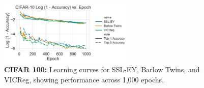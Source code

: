 \begin{figure}[H]
    \centering
    \includegraphics[width=0.57\textwidth]{figures/SSL/cifar10_learning_curve_log_error}
    \caption{\textbf{CIFAR 100: }Learning curves for SSL-EY, Barlow Twins, and VICReg, showing performance across 1,000 epochs.}
    \label{fig:ssl learning curve cifar10 top5}
\end{figure}

